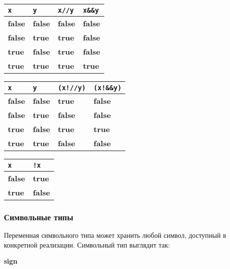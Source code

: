 \documentclass[10pt]{report}
\begin{document}
\begin{center}
\vspace{5mm}
\begin{longtable}{|l|l|l|l|}  \hline
\texttt{x}          & \texttt{y}        & \texttt{x//y}     & \texttt{x\&\&y}    \\  \hline
\textbf{false}       & \textbf{false}     & \textbf{false}     & \textbf{false}             \\  \hline
\textbf{false}       & \textbf{true}   & \textbf{true}   & \textbf{false}         \\  \hline
\textbf{true}     & \textbf{false}     & \textbf{true}   & \textbf{false}            \\  \hline
\textbf{true}     & \textbf{true}   & \textbf{true}   & \textbf{true}   \\ 
\hline
\end{longtable}

\begin{longtable}{|l|l|l|l|}  \hline
\texttt{x}          & \texttt{y}        & \texttt{(x!//y)}  &\texttt{(x!\&\&y)}  \\  \hline
\textbf{false}       & \textbf{false}     & \textbf{true}                   & \textbf{false}                         \\  \hline
\textbf{false}       & \textbf{true}   & \textbf{false}                     & \textbf{false}                         \\  \hline
\textbf{true}     & \textbf{false}     & \textbf{true}                   & \textbf{true}                       \\  \hline
\textbf{true}     & \textbf{true}   & \textbf{false}                     & \textbf{false}                         \\  \hline
\end{longtable}


\begin{longtable}{|l|l|}  \hline
 \texttt{x}         & \texttt{!x}       \\  \hline
\textbf{false}       & \textbf{true}   \\  \hline
\textbf{true}     & \textbf{false}     \\  \hline
\end{longtable}
\end{center}

        \subsubsection{Символьные типы}
Переменная символьного типа может хранить любой символ, доступный в конкретной реализации. Символьный тип выглядит так:
\begin{center}
\noindent\textbf{sign}
\end{center}
\end{document}

